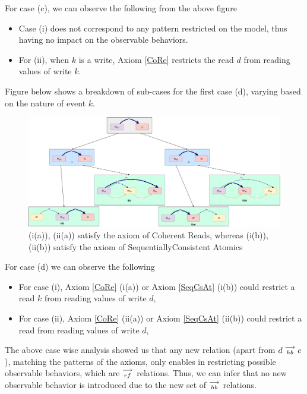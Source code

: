    For case (c), we can observe the following from the above figure
    \begin{itemize}
        \item Case (i) does not correspond to any pattern restricted on the model, thus having no impact on the observable behaviors. 
        \item For (ii), when $k$ is a write, Axiom \ref{CoRe} restricts the read $d$ from reading values of write $k$. 
    \end{itemize}

    Figure below shows a breakdown of sub-cases for the first case (d), varying based
    on the nature of event $k$.
    \begin{figure}[H]
        \centering
        \includegraphics[scale=0.4]{5.InstructionReordering/4.ValidReorderingCandidate/ProofParts/Part4/part4(d).pdf}
        \caption{(i(a)), (ii(a)) satisfy the axiom of Coherent Reads, whereas (i(b)), (ii(b)) satisfy the axiom of SequentiallyConsistent Atomics}
        \label{fig:my_label}
    \end{figure}

    For case (d) we can observe the following 
    \begin{itemize}
        \item For case (i), Axiom \ref{CoRe} (i(a)) or Axiom \ref{SeqCsAt} (i(b)) could restrict a read $k$ from reading values of write $d$, 
        \item For case (ii), Axiom \ref{CoRe} (ii(a)) or Axiom \ref{SeqCsAt} (ii(b)) could restrict a read from reading values of write $d$, 
    \end{itemize}
  
    The above case wise analysis showed us that any new relation (apart from $d\stackrel{\longrightarrow}{_{hb}}e$), matching the patterns of the axioms, only enables in restricting possible observable behaviors, which are $\stackrel{\longrightarrow}{_{rf}}$ relations. Thus, we can infer that no new observable behavior is introduced due to the new set of $\stackrel{\longrightarrow}{_{hb}}$ relations. 
    
